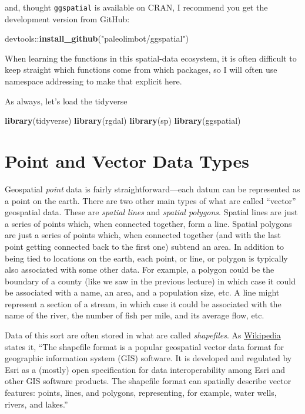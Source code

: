 \documentclass[]{book}
\newenvironment{Shaded}{\begin{snugshade}}{\end{snugshade}}
\newcommand{\KeywordTok}[1]{\textcolor[rgb]{0.13,0.29,0.53}{\textbf{{#1}}}}
\newcommand{\StringTok}[1]{\textcolor[rgb]{0.31,0.60,0.02}{{#1}}}
\newcommand{\NormalTok}[1]{{#1}}
\theoremstyle{definition}
\theoremstyle{definition}
\theoremstyle{remark}
\begin{document}
and, thought \texttt{ggspatial} is available on CRAN, I recommend you
get the development version from GitHub:

\begin{Shaded}
\begin{Highlighting}[]
\NormalTok{devtools::}\KeywordTok{install_github}\NormalTok{(}\StringTok{"paleolimbot/ggspatial"}\NormalTok{)}
\end{Highlighting}
\end{Shaded}

When learning the functions in this spatial-data ecosystem, it is often
difficult to keep straight which functions come from which packages, so
I will often use namespace addressing to make that explicit here.

As always, let's load the tidyverse

\begin{Shaded}
\begin{Highlighting}[]
\KeywordTok{library}\NormalTok{(tidyverse)}
\KeywordTok{library}\NormalTok{(rgdal)}
\KeywordTok{library}\NormalTok{(sp)}
\KeywordTok{library}\NormalTok{(ggspatial)}
\end{Highlighting}
\end{Shaded}

\section{Point and Vector Data Types}\label{point-and-vector-data-types}

Geospatial \emph{point} data is fairly straightforward---each datum can
be represented as a point on the earth. There are two other main types
of what are called ``vector'' geospatial data. These are \emph{spatial
lines} and \emph{spatial polygons}. Spatial lines are just a series of
points which, when connected together, form a line. Spatial polygons are
just a series of points which, when connected together (and with the
last point getting connected back to the first one) subtend an area. In
addition to being tied to locations on the earth, each point, or line,
or polygon is typically also associated with some other data. For
example, a polygon could be the boundary of a county (like we saw in the
previous lecture) in which case it could be associated with a name, an
area, and a population size, etc. A line might represent a section of a
stream, in which case it could be associated with the name of the river,
the number of fish per mile, and its average flow, etc.

Data of this sort are often stored in what are called \emph{shapefiles}.
As \href{https://en.wikipedia.org/wiki/Shapefile}{Wikipedia} states it,
``The shapefile format is a popular geospatial vector data format for
geographic information system (GIS) software. It is developed and
regulated by Esri as a (mostly) open specification for data
interoperability among Esri and other GIS software products. The
shapefile format can spatially describe vector features: points, lines,
and polygons, representing, for example, water wells, rivers, and
lakes.''
\end{document}
